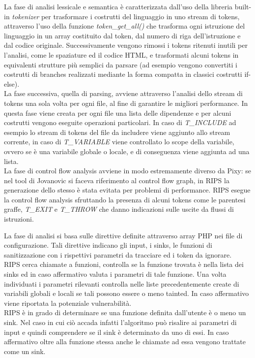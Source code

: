 La fase di analisi lessicale e semantica è caratterizzata dall'uso della libreria built-in \emph{tokenizer} per trasformare i costrutti del linguaggio in uno stream di tokens, attraverso l'uso della funzione \emph{token\_get\_all()} che trasforma ogni istruzione del linguaggio in un array costituito dal token, dal numero di riga dell'istruzione e dal codice originale. Successivamente vengono rimossi i tokens ritenuti inutili per l'analisi, come le spaziature ed il codice HTML, e trasformati alcuni tokens in equivalenti strutture più semplici da parsare (ad esempio vengono convertiti i costrutti di branches realizzati mediante la forma compatta in classici costrutti if-else).\\
La fase successiva, quella di parsing, avviene attraverso l'analisi dello stream di tokens una sola volta per ogni file, al fine di garantire le migliori performance. In questa fase viene creata per ogni file una lista delle dipendenze e per alcuni costrutti vengono eseguite operazioni particolari. In caso di \emph{T\_INCLUDE} ad esempio lo stream di tokens del file da includere viene aggiunto allo stream corrente, in caso di \emph{T\_VARIABLE} viene controllato lo scope della variabile, ovvero se è una variabile globale o locale, e di conseguenza viene aggiunta ad una lista.\\
La fase di control flow analysis avviene in modo estremamente diverso da Pixy: se nel tool di Jovanovic si faceva riferimento al control flow graph, in RIPS la generazione dello stesso è stata evitata per problemi di performance. RIPS esegue la control flow analysis sfruttando la presenza di alcuni tokens come le parentesi graffe, \emph{T\_EXIT} e \emph{T\_THROW} che danno indicazioni sulle uscite da flussi di istruzioni.

La fase di analisi si basa sulle direttive definite attraverso array PHP nei file di configurazione. Tali direttive indicano gli input, i sinks, le funzioni di sanitizzazione con i rispettivi parametri da tracciare ed i token da ignorare.\\
RIPS cerca chiamate a funzioni, controlla se la funzione trovata è nella lista dei sinks ed in caso affermativo valuta i parametri di tale funzione. Una volta individuati i parametri rilevanti controlla nelle liste precedentemente create di variabili globali e locali se tali possono essere o meno tainted. In caso affermativo viene riportata la potenziale vulnerabilità.\\
RIPS è in grado di determinare se una funzione definita dall'utente è o meno un sink. Nel caso in cui ciò accada infatti l'algoritmo può risalire ai parametri di input e quindi comprendere se il sink è determinato da uno di essi. In caso affermativo oltre alla funzione stessa anche le chiamate ad essa vengono trattate come un sink.

